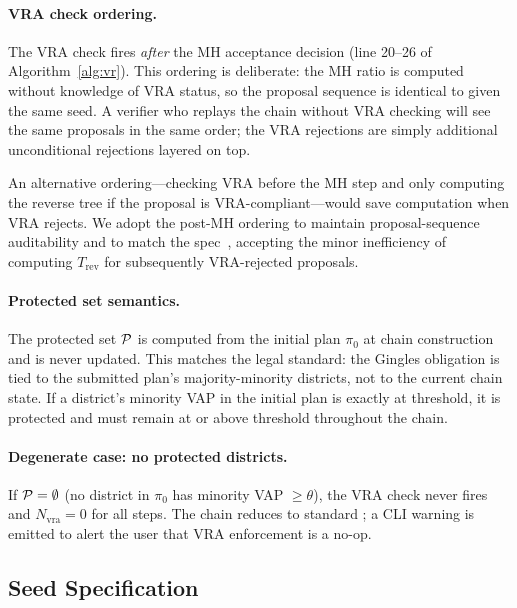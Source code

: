 \paragraph{VRA check ordering.}
The VRA check fires \emph{after} the MH acceptance decision (line 20--26 of
Algorithm~\ref{alg:vr}).
This ordering is deliberate: the MH ratio is computed without knowledge of
VRA status, so the proposal sequence is identical to \fr{} given the same seed.
A verifier who replays the chain without VRA checking will see the same
proposals in the same order; the VRA rejections are simply additional
unconditional rejections layered on top.

An alternative ordering---checking VRA before the MH step and only computing
the reverse tree if the proposal is VRA-compliant---would save computation
when VRA rejects.
We adopt the post-MH ordering to maintain proposal-sequence auditability and
to match the spec~\citep{dellaLibera2026vraSection}, accepting the minor
inefficiency of computing $T_{\mathrm{rev}}$ for subsequently VRA-rejected
proposals.

\paragraph{Protected set semantics.}
The protected set $\mathcal{P}$ is computed from the initial plan $\pi_0$ at chain
construction and is never updated.
This matches the legal standard: the Gingles obligation is tied to the
submitted plan's majority-minority districts, not to the current chain state.
If a district's minority VAP in the initial plan is exactly at threshold,
it is protected and must remain at or above threshold throughout the chain.

\paragraph{Degenerate case: no protected districts.}
If $\mathcal{P} = \emptyset$ (no district in $\pi_0$ has minority VAP $\geq \theta$),
the VRA check never fires and $N_{\mathrm{vra}} = 0$ for all steps.
The chain reduces to standard \fr{}; a CLI warning is emitted to alert the
user that VRA enforcement is a no-op.

\subsection{Seed Specification}

